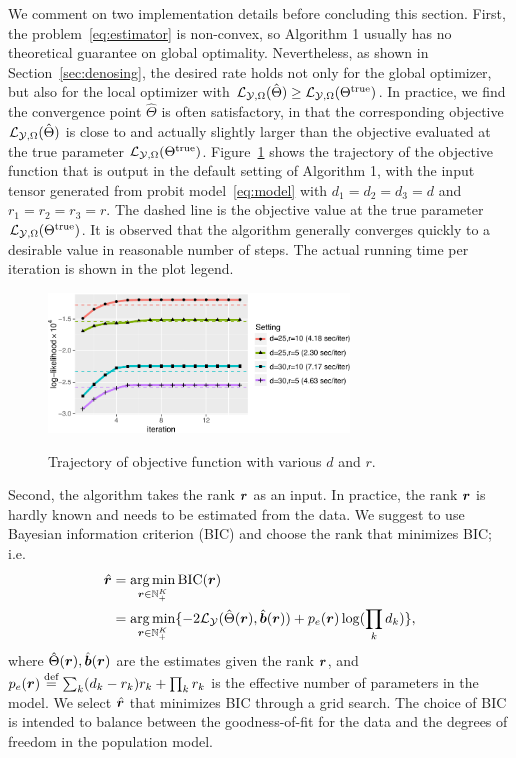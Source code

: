 \documentclass{article}
\theoremstyle{plain}
\theoremstyle{definition}
\begin{document}
We comment on two implementation details before concluding this section. First, the problem~\eqref{eq:estimator} is non-convex, so Algorithm 1 usually has no theoretical guarantee on global optimality. Nevertheless, as shown in Section~\ref{sec:denosing}, the desired rate holds not only for the global optimizer, but also for the local optimizer with $\mathcal{L}_{\mathcal{Y},\Omega}(\hat \Theta)\geq \mathcal{L}_{\mathcal{Y},\Omega}(\Theta^{\text{true}})$. In practice, we find the convergence point $\hat \Theta$ is often satisfactory, in that the corresponding objective $\mathcal{L}_{\mathcal{Y},\Omega}(\hat \Theta)$ is close to and actually slightly larger than the objective evaluated at the true parameter $\mathcal{L}_{\mathcal{Y},\Omega}(\Theta^{\text{true}})$. Figure~\ref{fig:stability} shows the trajectory of the objective function that is output in the default setting of Algorithm 1, with the input tensor generated from probit model~\eqref{eq:model} with $d_1=d_2=d_3=d$ and $r_1=r_2=r_3=r$. The dashed line is the objective value at the true parameter $\mathcal{L}_{\mathcal{Y},\Omega}(\Theta^{\text{true}})$. It is observed that the algorithm generally converges quickly to a desirable value in reasonable number of steps. The actual running time per iteration is shown in the plot legend. 


\begin{figure}[H]
\centering
\vspace{-.5cm}
\includegraphics[width=8cm]{algorithm.pdf}\label{fig:stability}
\vspace{-.3cm}
\caption{Trajectory of objective function with various $d$ and $r$.}
\vspace{-.7cm}
\end{figure}


Second, the algorithm takes the rank $\bm{r}$ as an input. In practice, the rank $\bm{r}$ is hardly known and needs to be estimated from the data. We suggest to use Bayesian information criterion (BIC) and choose the rank that minimizes BIC; i.e.
\begin{align}\label{eq:BIC}
\hat {\bm{r}}&=\operatorname*{arg\,min}_{\bm{r}\in\mathbb{N}^K_{+}} \text{BIC}(\bm{r})\\
&=\operatorname*{arg\,min}_{\bm{r}\in\mathbb{N}^K_{+}}\{-2\mathcal{L}_{\mathcal{Y}}(\hat \Theta(\bm{r}),\hat {\bm{b}}(\bm{r}))+p_e(\bm{r})\log (\prod_k d_k)\},
\end{align}
where $\hat \Theta(\bm{r}), \hat{\bm{b}}(\bm{r})$ are the estimates given the rank $\bm{r}$, and $p_e(\bm{r})\stackrel{\text{def}}{=}\sum_k (d_k-r_k)r_k+\prod_k r_k$ is the effective number of parameters in the model. We select $\hat {\bm{r}}$ that minimizes BIC through a grid search. The choice of BIC is intended to balance between the goodness-of-fit for the data and the degrees of freedom in the population model. 
\end{document}
